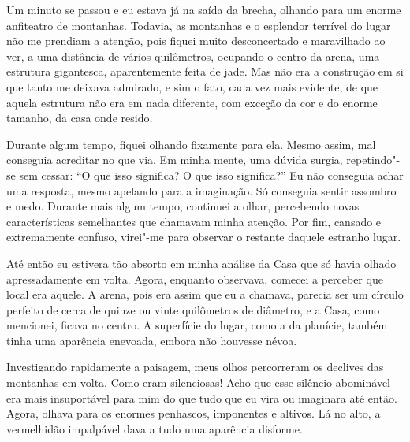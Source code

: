 Um minuto se passou e eu estava já na saída da brecha, olhando para um enorme anfiteatro de montanhas. Todavia, as
montanhas e o esplendor terrível do lugar não me prendiam a atenção, pois fiquei muito desconcertado e maravilhado ao
ver, a uma distância de vários quilômetros, ocupando o centro da arena, uma estrutura gigantesca, aparentemente feita
de jade. Mas não era a construção em si que tanto me deixava admirado, e sim o fato, cada vez mais evidente, de que
aquela estrutura não era em nada diferente, com exceção da cor e do enorme tamanho, da casa onde resido.

Durante algum tempo, fiquei olhando fixamente para ela. Mesmo assim, mal conseguia acreditar no que via. Em minha
mente, uma dúvida surgia, repetindo"-se sem cessar: ``O que isso significa? O que isso significa?'' Eu não conseguia achar
uma resposta, mesmo apelando para a imaginação. Só conseguia sentir assombro e medo. Durante mais algum tempo,
continuei a olhar, percebendo novas características semelhantes que chamavam minha atenção. Por fim, cansado e
extremamente confuso, virei"-me para observar o restante daquele estranho lugar.

Até então eu estivera tão absorto em minha análise da Casa que só havia olhado apressadamente em volta. Agora,
enquanto observava, comecei a perceber que local era aquele. A arena, pois era assim que eu a chamava, parecia ser um
círculo perfeito de cerca de quinze ou vinte quilômetros de diâmetro, e a Casa, como mencionei, ficava no centro.
A superfície do lugar, como a da planície, também tinha uma aparência enevoada, embora não houvesse névoa.

Investigando rapidamente a paisagem, meus olhos percorreram os declives das montanhas em volta. Como eram silenciosas!
Acho que esse silêncio abominável era mais insuportável para mim do que tudo que eu vira ou imaginara até então. Agora,
olhava para os enormes penhascos, imponentes e altivos. Lá no alto, a vermelhidão impalpável dava a tudo uma aparência
disforme.

